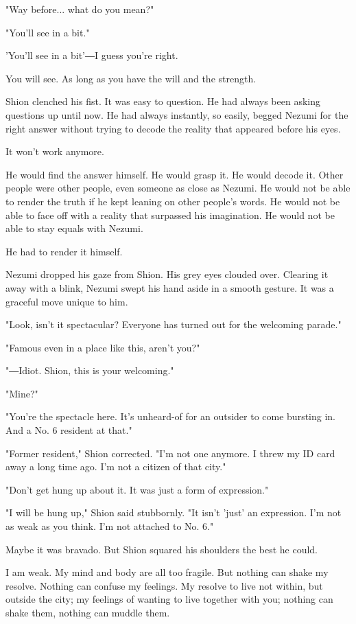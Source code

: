 "Way before... what do you mean?"

"You'll see in a bit."

'You'll see in a bit'―I guess you're right.

You will see. As long as you have the will and the strength.

Shion clenched his fist. It was easy to question. He had always been
asking questions up until now. He had always instantly, so easily,
begged Nezumi for the right answer without trying to decode the reality
that appeared before his eyes.

It won't work anymore.

He would find the answer himself. He would grasp it. He would decode it.
Other people were other people, even someone as close as Nezumi. He
would not be able to render the truth if he kept leaning on other
people's words. He would not be able to face off with a reality that
surpassed his imagination. He would not be able to stay equals with
Nezumi.

He had to render it himself.

Nezumi dropped his gaze from Shion. His grey eyes clouded over. Clearing
it away with a blink, Nezumi swept his hand aside in a smooth gesture.
It was a graceful move unique to him.

"Look, isn't it spectacular? Everyone has turned out for the welcoming
parade."

"Famous even in a place like this, aren't you?"

"―Idiot. Shion, this is your welcoming."

"Mine?"

"You're the spectacle here. It's unheard-of for an outsider to come
bursting in. And a No. 6 resident at that."

"Former resident," Shion corrected. "I'm not one anymore. I threw my ID
card away a long time ago. I'm not a citizen of that city."

"Don't get hung up about it. It was just a form of expression."

"I will be hung up," Shion said stubbornly. "It isn't 'just' an
expression. I'm not as weak as you think. I'm not attached to No. 6."

Maybe it was bravado. But Shion squared his shoulders the best he could.

I am weak. My mind and body are all too fragile. But nothing can shake
my resolve. Nothing can confuse my feelings. My resolve to live not
within, but outside the city; my feelings of wanting to live together
with you; nothing can shake them, nothing can muddle them.

